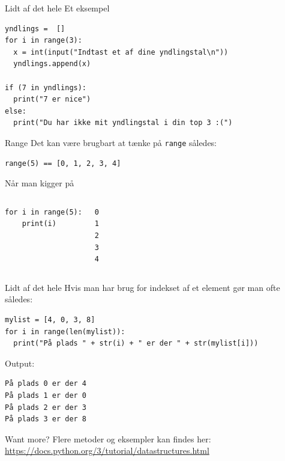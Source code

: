\begin{frame}[fragile]{Lidt af det hele}
Et eksempel
	\begin{lstlisting}[style=python]
yndlings =  []
for i in range(3):
  x = int(input("Indtast et af dine yndlingstal\n"))
  yndlings.append(x)

if (7 in yndlings):
  print("7 er nice")
else:
  print("Du har ikke mit yndlingstal i din top 3 :(")
	\end{lstlisting}
\end{frame}


\begin{frame}[fragile]{Range}
Det kan være brugbart at tænke på \texttt{range} således:


\begin{lstlisting}[style=python]
range(5) == [0, 1, 2, 3, 4]
\end{lstlisting}

\pause
Når man kigger på 

\begin{columns}
	\begin{lstlisting}[style=python]
for i in range(5):
	print(i)
	\end{lstlisting}
	\begin{lstlisting}[style=python]
0
1
2
3
4
	\end{lstlisting}
\end{columns}
\end{frame}


\begin{frame}[fragile]{Lidt af det hele}
Hvis man har brug for indekset af et element gør man ofte således:
\begin{lstlisting}[style=python]
mylist = [4, 0, 3, 8]
for i in range(len(mylist)):
  print("På plads " + str(i) + " er der " + str(mylist[i]))
\end{lstlisting}
\pause

Output:
\begin{lstlisting}[style=python]
På plads 0 er der 4
På plads 1 er der 0
På plads 2 er der 3
På plads 3 er der 8
\end{lstlisting}
\end{frame}


\begin{frame}{Want more?}
	Flere metoder og eksempler kan findes her:\\
	\url{https://docs.python.org/3/tutorial/datastructures.html}
\end{frame}


